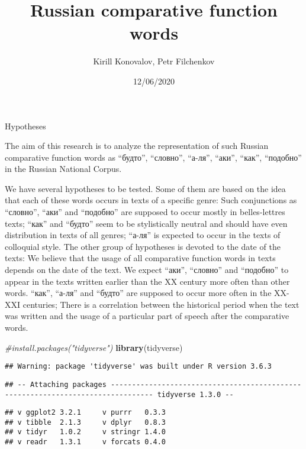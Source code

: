 \documentclass[
]{article}
\title{Russian comparative function words}
\author{Kirill Konovalov, Petr Filchenkov}
\date{12/06/2020}
\newenvironment{Shaded}{\begin{snugshade}}{\end{snugshade}}
\newcommand{\CommentTok}[1]{\textcolor[rgb]{0.56,0.35,0.01}{\textit{#1}}}
\newcommand{\KeywordTok}[1]{\textcolor[rgb]{0.13,0.29,0.53}{\textbf{#1}}}
\newcommand{\NormalTok}[1]{#1}
\begin{document}
\maketitle

Hypotheses

The aim of this research is to analyze the representation of such
Russian comparative function words as ``будто'', ``словно'', ``а-ля'',
``аки'', ``как'', ``подобно'' in the Russian National Corpus.

We have several hypotheses to be tested. Some of them are based on the
idea that each of these words occurs in texts of a specific genre: Such
conjunctions as ``словно'', ``аки'' and ``подобно'' are supposed to
occur mostly in belles-lettres texts; ``как'' and ``будто'' seem to be
stylistically neutral and should have even distribution in texts of all
genres; ``а-ля'' is expected to occur in the texts of colloquial style.
The other group of hypotheses is devoted to the date of the texts: We
believe that the usage of all comparative function words in texts
depends on the date of the text. We expect ``аки'', ``словно'' and
``подобно'' to appear in the texts written earlier than the XX century
more often than other words. ``как'', ``а-ля'' and ``будто'' are
supposed to occur more often in the XX-XXI centuries; There is a
correlation between the historical period when the text was written and
the usage of a particular part of speech after the comparative words.

\begin{Shaded}
\begin{Highlighting}[]
\CommentTok{#install.packages("tidyverse")}
\KeywordTok{library}\NormalTok{(tidyverse)}
\end{Highlighting}
\end{Shaded}

\begin{verbatim}
## Warning: package 'tidyverse' was built under R version 3.6.3
\end{verbatim}

\begin{verbatim}
## -- Attaching packages -------------------------------------------------------------------------------- tidyverse 1.3.0 --
\end{verbatim}

\begin{verbatim}
## v ggplot2 3.2.1     v purrr   0.3.3
## v tibble  2.1.3     v dplyr   0.8.3
## v tidyr   1.0.2     v stringr 1.4.0
## v readr   1.3.1     v forcats 0.4.0
\end{verbatim}
\end{document}
